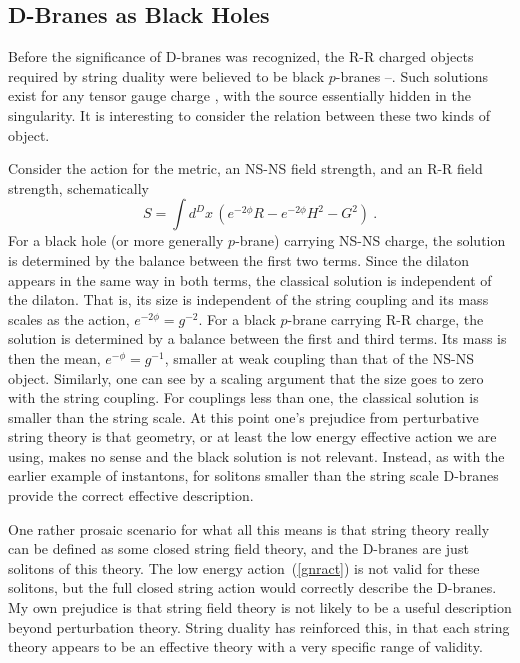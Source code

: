 \documentclass[12pt]{article}
\def\be{\begin{equation}}
\def\ee{\end{equation}}
\begin{document}
\subsection{D-Branes as Black Holes}

Before the significance of D-branes was recognized, the R-R charged objects
required by string duality were believed to be black
$p$-branes \cite{hullt}--\cite{coni}.
Such solutions exist for any tensor gauge charge \cite{blackp}, with the source
essentially hidden in the singularity.  It is interesting to consider the
relation between these two kinds of object.

Consider the action for the metric, an NS-NS field strength, and an R-R field
strength, schematically
\be
S = \int d^Dx\, \left( e^{-2\phi} R -  e^{-2\phi} H^2 -  G^2
\right) \ .  \label{gnract}
\ee
For a black hole (or more generally $p$-brane) carrying NS-NS charge, the
solution is determined by the balance between the first two terms.  Since the
dilaton appears in the same way in both terms, the classical solution is
independent of the dilaton.  That is, its size is independent of the string
coupling and its mass scales as the action,
$e^{-2\phi} = g^{-2}$. For a black $p$-brane carrying R-R charge, the solution
is determined by a balance between the first and third terms.  Its mass is
then the mean,
$e^{-\phi} = g^{-1}$, smaller at weak coupling than that of the NS-NS object. 
Similarly, one can see by a scaling argument that the size goes to zero with
the string coupling.  For couplings less than one, the classical solution is
smaller than the string scale.  At this point one's prejudice from
perturbative string theory is that geometry, or at least the low energy
effective action we are using, makes no sense and the black solution is not
relevant.
Instead, as with the earlier example of instantons, for solitons smaller than
the string scale D-branes provide the correct effective description.

One rather prosaic scenario for what all this means is that string theory
really can be defined as some closed string field theory, and the D-branes are
just solitons of this theory.  The low energy action~(\ref{gnract}) is not
valid for these solitons, but the full closed string action would correctly
describe the D-branes.  My own prejudice \cite{lesh} is that string field
theory is not likely to be a useful description beyond perturbation theory.
String duality has reinforced this, in that each string theory
appears to be an effective theory with a very specific range of validity.
\end{document}
